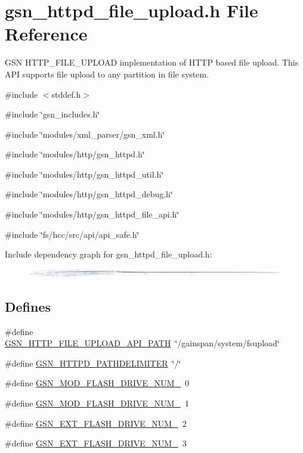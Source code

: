 \hypertarget{a00512}{
\section{gsn\_\-httpd\_\-file\_\-upload.h File Reference}
\label{a00512}
}


GSN HTTP\_\-FILE\_\-UPLOAD implementation of HTTP based file upload. This API supports file upload to any partition in file system.  


{\ttfamily \#include $<$stddef.h$>$}\par
{\ttfamily \#include \char`\"{}gsn\_\-includes.h\char`\"{}}\par
{\ttfamily \#include \char`\"{}modules/xml\_\-parser/gsn\_\-xml.h\char`\"{}}\par
{\ttfamily \#include \char`\"{}modules/http/gsn\_\-httpd.h\char`\"{}}\par
{\ttfamily \#include \char`\"{}modules/http/gsn\_\-httpd\_\-util.h\char`\"{}}\par
{\ttfamily \#include \char`\"{}modules/http/gsn\_\-httpd\_\-debug.h\char`\"{}}\par
{\ttfamily \#include \char`\"{}modules/http/gsn\_\-httpd\_\-file\_\-api.h\char`\"{}}\par
{\ttfamily \#include \char`\"{}fs/hcc/src/api/api\_\-safe.h\char`\"{}}\par
Include dependency graph for gsn\_\-httpd\_\-file\_\-upload.h:
\nopagebreak
\begin{figure}[H]
\begin{center}
\leavevmode
\includegraphics[width=400pt]{a00744}
\end{center}
\end{figure}
\subsection*{Defines}
\begin{DoxyCompactItemize}
\item 
\#define \hyperlink{a00512_a6edc031eda94ce06237695299f1d3070}{GSN\_\-HTTP\_\-FILE\_\-UPLOAD\_\-API\_\-PATH}~\char`\"{}/gainspan/system/fsupload\char`\"{}
\item 
\#define \hyperlink{a00512_af6d82e0d4b1e8efaaf8cfd99e23f0e96}{GSN\_\-HTTPD\_\-PATHDELIMITER}~\char`\"{}/\char`\"{}
\item 
\#define \hyperlink{a00512_ad849668fc7f8947cff98961b8e841d1c}{GSN\_\-MOD\_\-FLASH\_\-DRIVE\_\-NUM\_}~0
\item 
\#define \hyperlink{a00512_a369bf64284f606db1280e9ba1ac1480a}{GSN\_\-MOD\_\-FLASH\_\-DRIVE\_\-NUM\_}~1
\item 
\#define \hyperlink{a00512_ab5c1bca572ab41227e20e3e9ce33aaf8}{GSN\_\-EXT\_\-FLASH\_\-DRIVE\_\-NUM\_}~2
\item 
\#define \hyperlink{a00512_a02c5f458fa66efa8b7d9d6e85a3c4e2e}{GSN\_\-EXT\_\-FLASH\_\-DRIVE\_\-NUM\_}~3
\end{DoxyCompactItemize}
